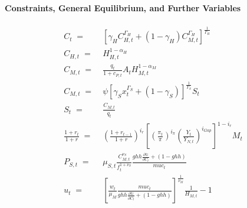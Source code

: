 \documentclass[12pt,3p,authoryear,review]{elsarticle}
\begin{document}
\paragraph{Constraints, General Equilibrium, and Further Variables}%
\begin{small}%
    \begin{align*}%
        C_t \; = & \; \left[ \gamma_H C_{H,t}^{\Gamma_H} + \left(1-\gamma_H\right) C_{M,t}^{\Gamma_H} \right]^{\frac{1}{\Gamma_H}}\\%
        C_{H,t} \; = & \; H_{H,t}^{1-\alpha_H}\\%
        C_{M,t} \; = & \; \frac{q_t}{1+c_{P,t}} A_t H_{M,t}^{1-\alpha_M}\\%
        C_{M,t} \; = & \; \psi \left[ \gamma_S x_t^{\Gamma_S} + \left(1-\gamma_S\right) \right]^{\frac{1}{\Gamma_S}} S_t\\%
        S_t \; = & \; \frac{C_{M,t}}{q_t}\\%
        \frac{1+r_t}{1+r} \; = & \; \left(\frac{1+r_{t-1}}{1+r}\right)^{i_r} \left[ \left(\frac{\pi_t}{\pi}\right)^{i_\pi} \left(\frac{Y_t}{Y_{N,t}}\right)^{i_{Gap}} \right]^{1-i_r} M_t\\%
        P_{S,t} \; = & \; \mu_{S,t} \frac{C_{M,t}^{\nu_S}}{f_t^{1+\nu_S}} \frac{ghh \frac{\partial \mathbb{U}}{\partial C_t}+\left(1-ghh\right)}{muc_t}\\%
        u_t \; = & \; \left[ \frac{w_t}{\mu_M} \frac{muc_t}{ghh \frac{\partial \mathbb{U}}{\partial C_t}+\left(1-ghh\right)} \right]^{\frac{1}{\nu_M}} \frac{1}{H_{M,t}} - 1%
    \end{align*}%
\end{small}%
\pagebreak%
\end{document}

